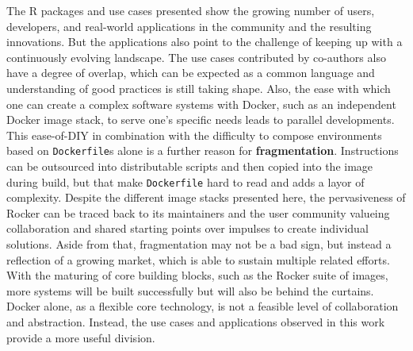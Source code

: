 The R packages and use cases presented show the growing number of users,
developers, and real-world applications in the community and the
resulting innovations. But the applications also point to the challenge
of keeping up with a continuously evolving landscape. The use cases
contributed by co-authors also have a degree of overlap, which can be
expected as a common language and understanding of good practices is
still taking shape. Also, the ease with which one can create a complex
software systems with Docker, such as an independent Docker image stack,
to serve one's specific needs leads to parallel developments. This
ease-of-DIY in combination with the difficulty to compose environments
based on \texttt{Dockerfile}s alone is a further reason for
\textbf{fragmentation}. Instructions can be outsourced into
distributable scripts and then copied into the image during build, but
that make \texttt{Dockerfile} hard to read and adds a layor of
complexity. Despite the different image stacks presented here, the
pervasiveness of Rocker can be traced back to its maintainers and the
user community valueing collaboration and shared starting points over
impulses to create individual solutions. Aside from that, fragmentation
may not be a bad sign, but instead a reflection of a growing market,
which is able to sustain multiple related efforts. With the maturing of
core building blocks, such as the Rocker suite of images, more systems
will be built successfully but will also be behind the curtains. Docker
alone, as a flexible core technology, is not a feasible level of
collaboration and abstraction. Instead, the use cases and applications
observed in this work provide a more useful division.

